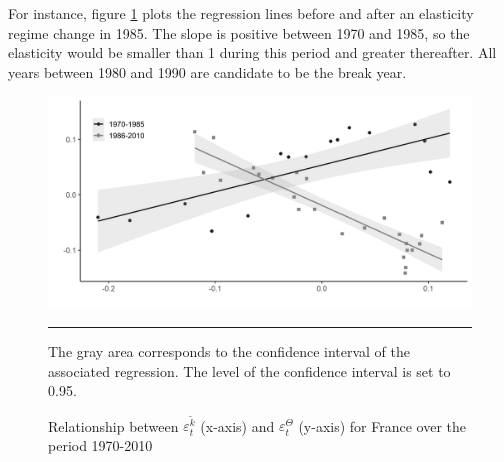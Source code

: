 For instance, figure \ref{fig:k_Theta_log_reg85} plots the regression lines before and after an elasticity regime change in 1985. The slope is positive between 1970 and 1985, so the elasticity would be smaller than 1 during this period and greater thereafter. All years between 1980 and 1990 are candidate to be the break year.
	\begin{figure}[tb]
		\centering
		\includegraphics[width=1\linewidth]{../result/appendix_CD/k_Theta_log_reg85.png}
		\caption{Relationship between $\varepsilon_t^{\tilde{k}}$ (x-axis) and $\varepsilon_t^\Theta$ (y-axis) for France over the period 1970-2010}
		\label{fig:k_Theta_log_reg85}
		\vspace{.5ex}
		\hrule
		\vspace{-4ex}
		\justify\singlespacing\footnotesize The gray area corresponds to the confidence interval of the associated regression. The level of the confidence interval is set to 0.95.
	\end{figure}

